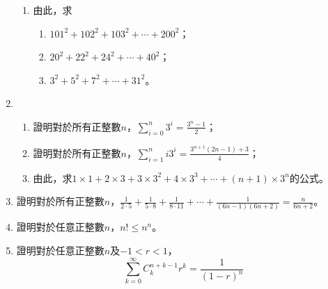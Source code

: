 \documentclass[12pt]{article}
\begin{document}
\begin{enumerate}
\begin{enumerate}
            \item 由此，求\begin{enumerate}
                \item $101^2+102^2+103^2+\cdots+200^2$；
                \item $20^2+22^2+24^2+\cdots+40^2$；
                \item $3^2+5^2+7^2+\cdots+31^2$。
            \end{enumerate}
        \end{enumerate}
        \item \begin{enumerate}
            \item 證明對於所有正整數$n$，$\displaystyle \sum_{i=0}^{n}3^i=\frac{3^n-1}{2}$；
            \item 證明對於所有正整數$n$，$\displaystyle \sum_{i=1}^{n}i3^i=\frac{3^{n+1}(2n-1)+3}{4}$；
            \item 由此，求$1\times 1+2\times 3+3\times 3^2+4\times 3^3+\cdots +(n+1)\times 3^n$的公式。
        \end{enumerate}
        \item 證明對於所有正整數$n$，$\displaystyle \frac{1}{2\cdot 5}+\frac{1}{5\cdot 8}+\frac{1}{8\cdot 11}+\cdots+\frac{1}{(6n-1)(6n+2)}=\frac{n}{6n+2}$。
        \item 證明對於任意正整數$n$，$n!\leq n^n$。
        \item 證明對於任意正整數$n$及$-1<r<1$，$$\sum_{k=0}^\infty C_k^{n+k-1}r^k=\frac{1}{(1-r)^n}$$
    \end{enumerate}
    
\end{document}
